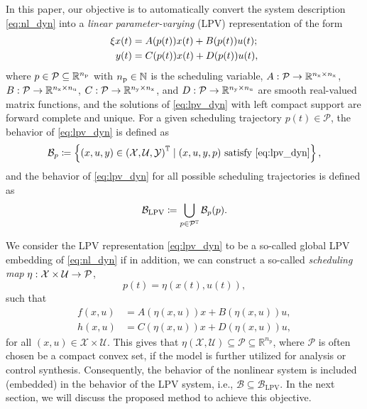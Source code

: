 In this paper, our objective is to automatically convert the system description \eqref{eq:nl_dyn} into a \emph{linear parameter-varying} (LPV) representation of the form
%
\begin{subequations}
	\label{eq:lpv_dyn}
	\begin{align}
		\xi x(t) & = A(p(t))x(t) + B(p(t))u(t); \\
		y(t)       & = C(p(t))x(t) + D(p(t))u(t),
	\end{align}
\end{subequations}
%
where $p \in \mathcal{P} \subseteq \mathbb{R}^{n_\mathrm{p}}$ with $n_\mathrm{p} \in \mathbb{N}$ is the scheduling variable, $A : \mathcal{P} \rightarrow \mathbb{R}^{n_\mathrm{x} \times n_\mathrm{x}}$, $B : \mathcal{P} \rightarrow \mathbb{R}^{n_\mathrm{x} \times n_\mathrm{u}}$, $C : \mathcal{P} \rightarrow \mathbb{R}^{n_\mathrm{y} \times n_\mathrm{x}}$, and $D : \mathcal{P} \rightarrow \mathbb{R}^{n_\mathrm{y} \times n_\mathrm{u}}$ are smooth real-valued matrix functions, and the solutions of \eqref{eq:lpv_dyn} with left compact support are forward complete and unique. For a given scheduling trajectory $p(t)\in\mathcal{P}$, the behavior of \eqref{eq:lpv_dyn} is defined as
%
\begin{equation}
	\label{eq:p_behavior}
	\mathcal{B}_p \coloneq \left\{ (x, u, y) \in \left(\mathcal{X}, \mathcal{U}, \mathcal{Y}\right)^{\mathbb{T}} \mid (x, u, y, p) ~ \text{satisfy}~\eqref{eq:lpv_dyn} \right\},
\end{equation}
%
and the behavior of \eqref{eq:lpv_dyn} for all possible scheduling trajectories is defined as
%
\begin{equation}
	\label{eq:lpv_behavior}
	\mathcal{B}_{\text{LPV}} \coloneq \bigcup_{p \in \mathcal{P}^{\mathbb{T}}} \mathcal{B}_p(p).
\end{equation}


We consider the LPV representation \eqref{eq:lpv_dyn} to be a so-called global LPV embedding of \eqref{eq:nl_dyn} if in addition, we can construct a so-called \emph{scheduling map} $\eta : \mathcal{X} \times \mathcal{U} \rightarrow \mathcal{P}$,
%
\begin{equation}
	\label{eq:scheduling_map}
	p(t) = \eta(x(t), u(t)),
\end{equation}
such that
%
\begin{subequations}
\label{eq:LPV_realization}
	\begin{align}
		f(x, u) & = A(\eta(x, u)) x + B(\eta(x, u)) u, \\
		h(x, u) & = C(\eta(x, u)) x + D(\eta(x, u)) u, 
	\end{align}
\end{subequations}
%
for all $(x, u) \in \mathcal{X} \times \mathcal{U}$. This gives that $\eta(\mathcal{X},\mathcal{U})\subseteq \mathcal{P} \subseteq \mathbb{R}^{n_\mathrm{p}}$, where $\mathcal{P}$ is often chosen be a compact convex set, if the model is further utilized for analysis or control synthesis.
Consequently, the behavior of the nonlinear system is included (embedded) in the behavior of the LPV system, i.e., $\mathcal{B} \subseteq \mathcal{B}_{\text{LPV}}$. In the next section, we will discuss the proposed method to achieve this objective.


